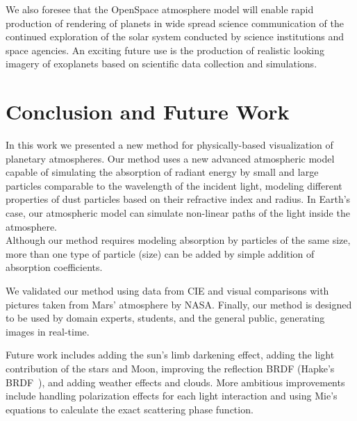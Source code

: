 \documentclass[journal]{vgtc}                %
\begin{document}
We also foresee that the OpenSpace atmosphere model will enable rapid production of rendering of planets in wide spread science communication  of the continued exploration of the solar system conducted by science institutions and space agencies. An exciting future use is the production of realistic looking imagery of exoplanets based on scientific data collection and simulations.   


\vspace*{-1.7mm}
\section{Conclusion and Future Work}

In this work we presented a new method for physically-based visualization of planetary atmospheres. Our method uses a new advanced atmospheric model capable of simulating the absorption of radiant energy by small and large particles comparable to the wavelength of the incident light, modeling different properties of dust particles based on their refractive index and radius. In Earth's case, our atmospheric model can simulate non-linear paths of the light inside the atmosphere.\\
Although our method requires modeling absorption by particles of the same size, more than one type of particle (size) can be added by simple addition of absorption coefficients.

We validated our method using data from CIE and visual comparisons with pictures taken from Mars' atmosphere by NASA. Finally, our method is designed to be used by domain experts, students, and the general public, generating images in real-time.

Future work includes adding the sun's limb darkening effect, adding the light contribution of the stars and Moon, improving the reflection BRDF (Hapke's BRDF~\cite{Hapke:2002}), and adding weather effects and clouds. More ambitious improvements include handling polarization effects for each light interaction and using Mie's equations to calculate the exact scattering phase function.

\vspace*{-1.7mm}

\newpage
\balance
%

%
%
%


\end{document}
